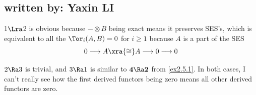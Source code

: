 \subsection{written by: Yaxin LI}
1$\Lra$2 is obvious because $-\otimes B$ being exact means it preserves SES's, which is equivalent to all the $\Tor_i(A,B)=0$ for $i\ge1$ because $A$ is a part of the SES
\[0\longrightarrow A\xra{\cong}A\longrightarrow0\longrightarrow0\]

$2\Ra3$ is trivial, and $3\Ra1$ is similar to $\mathbf{4\Ra2}$ from \ref{ex2.5.1}. In both cases, I can't really see how the first derived functors being zero means all other derived functors are zero.